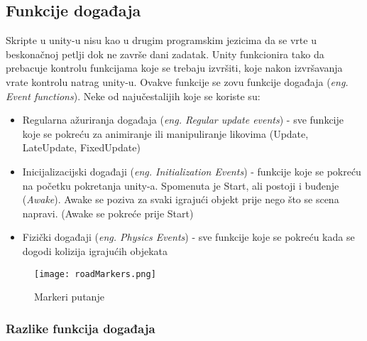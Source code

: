 \subsection{Funkcije događaja}
Skripte u unity-u nisu kao u drugim programskim jezicima da se vrte u beskonačnoj petlji dok ne završe dani zadatak. Unity funkcionira tako da prebacuje kontrolu funkcijama koje se trebaju izvršiti, koje nakon izvršavanja vrate kontrolu natrag unity-u. Ovakve funkcije se zovu funkcije događaja (\emph{eng. Event functions}). Neke od najučestalijih koje se koriste su:
\begin{itemize} 
	\item Regularna ažuriranja događaja (\emph{eng. Regular update events}) - sve funkcije koje se pokreću za animiranje ili manipuliranje likovima (Update, LateUpdate, FixedUpdate)
	\item Inicijalizacijski događaji (\emph{eng. Initialization Events}) - funkcije koje se pokreću na početku pokretanja unity-a. Spomenuta je Start, ali postoji i buđenje (\emph{Awake}). Awake se poziva za svaki igrajući objekt prije nego što se scena napravi. (Awake se pokreće prije Start)
	\item Fizički događaji (\emph{eng. Physics Events}) - sve funkcije koje se pokreću kada se dogodi kolizija igrajućih objekata
\end{itemize}
\begin{figure}[h]
	\texttt{[image: roadMarkers.png]}
	\centering
	\caption{Markeri putanje}
	\label{fig:markeriPutanje}
\end{figure}
\subsubsection{Razlike funkcija događaja}